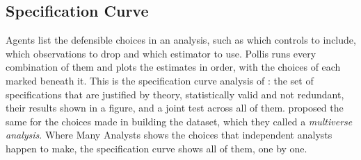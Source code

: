 \subsection{Specification Curve}
Agents list the defensible choices in an analysis, such as which controls to include, which observations to drop and
which estimator to use. Pollis runs every combination of them and plots the estimates in order, with the choices of
each marked beneath it. This is the specification curve analysis of : the set of specifications that are justified by theory, statistically valid and not redundant, their results
shown in a figure, and a joint test across all of them.  proposed the same for the choices made in building the dataset, which they called a \emph{multiverse
analysis}. Where Many Analysts shows the choices that independent analysts happen to make, the specification curve
shows all of them, one by one.

